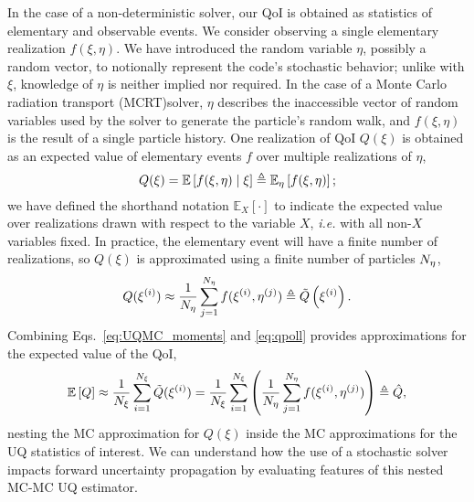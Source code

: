 In the case of a non-deterministic solver, our QoI is obtained as statistics of elementary and observable events. We consider observing a single elementary realization $f(\xi, \eta)$. We have introduced the random variable $\eta$, possibly a random vector, to notionally represent the code's stochastic behavior; unlike with $\xi$, knowledge of $\eta$ is neither implied nor required. 
In the case of a Monte Carlo radiation transport (MCRT)solver, $\eta$ describes the inaccessible vector of random variables used by the solver to generate the particle's random walk, and $f(\xi, \eta)$ is the result of a single particle history. One realization of QoI $Q(\xi)$ is obtained as an expected value of elementary events $f$ over multiple realizations of $\eta$, \begin{equation}
\label{eq:QoI_UQ}
 Q(\xi) = \mathbb{E}\left[f(\xi,\eta) \;\middle|\; \xi\right]  \triangleq \mathbb{E}_\eta\left[ f(\xi,\eta) \right];
\end{equation}
we have defined the shorthand notation $\mathbb{E}_X\left[\cdot\right]$ to indicate the expected value over realizations drawn with respect to the variable $X$, \textit{i.e.} with all non-$X$ variables fixed. In practice, the elementary event will have a finite number of realizations, so $Q(\xi)$ is approximated using a finite number of particles ${N_\eta}$,
\begin{equation}\label{eq:qpoll}
    Q(\xi^{(i)}) \approx \frac{1}{{N_\eta}} \sum_{j=1}^{N_\eta} f(\xi^{(i)},\eta^{(j)})
          \triangleq \tilde{Q}\left(\xi^{(i)}\right).
\end{equation}
Combining Eqs.~\eqref{eq:UQMC_moments} and \eqref{eq:qpoll} provides approximations for the expected value of the QoI,
\begin{equation}\label{eq:MCMC_moments}
        \mathbb{E}\left[Q\right] \approx \frac{1}{{N_\xi}} \sum_{i=1}^{{N_\xi}} \tilde{Q}(\xi^{(i)})
        = \frac{1}{{N_\xi}} \sum_{i=1}^{{N_\xi}} \left( \frac{1}{{N_\eta}} \sum_{j=1}^{N_\eta} f(\xi^{(i)},\eta^{(j)}) \right)  \triangleq \hat{Q} ,
\end{equation}
nesting the MC approximation for $Q(\xi)$ inside the MC approximations for the UQ statistics of interest. We can understand how the use of a stochastic solver impacts forward uncertainty propagation by evaluating features of this nested MC-MC UQ estimator. 


